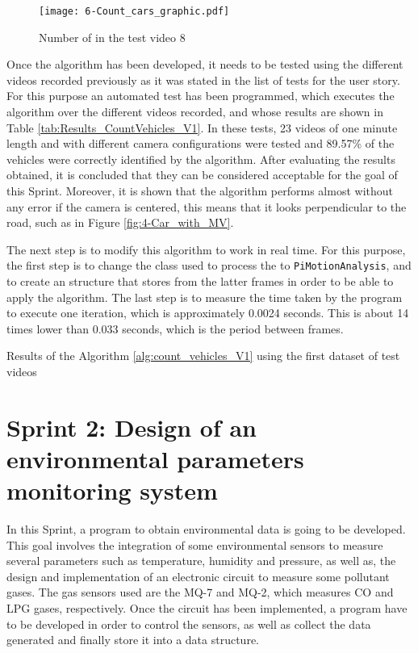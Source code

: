 \begin{figure}[!h]
	\begin{center}
		\texttt{[image: 6-Count\_cars\_graphic.pdf]}
		\caption{Number of  in the test video 8}
		\label{fig:6-Count_cars_graphic}
	\end{center}
\end{figure}

Once the algorithm has been developed, it needs to be tested using the different videos recorded previously as it was stated in the list of tests for the user story. For this purpose an automated test has been programmed, which executes the algorithm over the different videos recorded, and whose results are shown in Table \ref{tab:Results_CountVehicles_V1}. In these tests, 23 videos of one minute length and with different camera configurations were tested and 89.57\% of the vehicles were correctly identified by the algorithm. After evaluating the results obtained, it is concluded that they can be considered acceptable for the goal of this Sprint. Moreover, it is shown that the algorithm performs almost without any error if the camera is centered, this means that it looks perpendicular to the road, such as in Figure \ref{fig:4-Car_with_MV}. 

The next step is to modify this algorithm to work in real time. For this purpose, the first step is to change the class used to process the  to \texttt{PiMotionAnalysis}, and to create an structure that stores  from the latter frames in order to be able to apply the algorithm. The last step is to measure the time taken by the program to execute one iteration, which is approximately 0.0024 seconds. This is about 14 times lower than 0.033 seconds, which is the period between frames.

\begin{table}[!h]
	\centering
	{\small
		
	}
	\caption{Results of the Algorithm \ref{alg:count_vehicles_V1} using the first dataset of test videos}
	\label{tab:Results_CountVehicles_V1}
\end{table}


\clearpage
\section{Sprint 2: Design of an environmental parameters monitoring system}
In this Sprint, a program to obtain environmental data is going to be developed. This goal involves the integration of some environmental sensors to measure several parameters such as temperature, humidity and pressure, as well as, the design and implementation of an electronic circuit to measure some pollutant gases. The gas sensors used are the MQ-7 and MQ-2, which measures CO and LPG gases, respectively. Once the circuit has been implemented, a program have to be developed in order to control the sensors, as well as collect the data generated and finally store it into a data structure.

